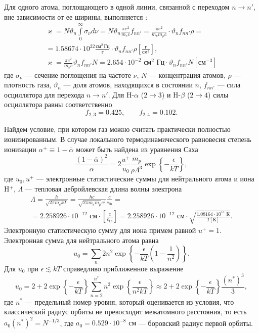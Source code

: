 Для одного атома, поглощающего в одной линии, связанной с переходом $n \to n'$, вне зависимости от ее ширины, выполняется \cite{zeldovich2008}:
\[\begin{gathered}
\varkappa = N\vartheta_n\int\limits_0^\infty \sigma_\nu d\nu = N \vartheta_n\frac{\pi e^2}{m_ec} f_{nn'}= 
 \frac{\pi e^2}{m_e m_p c} \cdot  \vartheta_n f_{nn'}\rho =  \\ =
1.58674 \cdot 10^{22}\frac{\text{см}^2\, \text{Гц}}{\text{г}} \cdot \vartheta_n f_{nn'}\rho \left[\frac{\text{г}}{\text{см}^3}\right]
,\\
\varkappa = \frac{\pi e^2}{m_ec} \vartheta_n f_{nn'} N = 2.654 \cdot 10^{-2} \text{ см}^2 \text{ Гц}
\cdot \vartheta_n f_{nn'} N[\text{см}^{-3}]
\end{gathered}\]
где $\sigma_\nu$ --- сечение поглощения на частоте $\nu$, $N$ --- концентрация атомов, $\rho$ --- плотность газа, $\vartheta_n$ --- доля атомов, находящихся в состоянии $n$, $f_{nn'}$ --- сила осциллятора для перехода $n \to n'$. Для H-$\alpha$ ($2 \to 3$) и H-$\beta$ ($2 \to 4$) силы осциллятора равны соответственно
\[
f_{2,3} = 0.425, \qquad f_{2,4} = 0.102.
\]

Найдем условие, при котором газ можно считать практически полностью ионизированным. В случае локального термодинамического равновесия степень ионизации $\alpha^+ \equiv 1 - \overline{\alpha}$ может быть найдена из уравнения Саха \cite{saha1921}
\[
\frac{(1-\overline{\alpha})^2}{\overline{\alpha}} = 2\frac{u^+}{u_0} \frac{m_p}{\rho\Lambda^3} 
\exp\left\{-\frac{\epsilon}{kT}\right\},
\]
где $u_0, u^+$ --- электронные статистические суммы для нейтрального атома и иона H${}^+$, $\Lambda$ --- тепловая дебройлевская длина волны электрона
\begin{multline*}
\Lambda = \frac{h}{\sqrt{2\pi m_e kT}} = \frac{hc}{\sqrt{2\pi m_e m_p}c^2} \frac{c}{c_\text{th}} = \\
= 2.258926 \cdot 10^{-12} \text{ см} \cdot \left[\frac{c}{c_\text{th}}\right]
= 2.258926 \cdot 10^{-12} \text{ см} \cdot \sqrt{\frac{1.08164 \cdot 10^{13} \text{ К}}{T [\text{К}]}}
 .
\end{multline*}
Электронную статистическую сумму для иона примем равной $u^+ = 1$. Электронная сумма для нейтрального атома равна
\[
u_0 = \sum_n 2n^2 \exp\left\{-\frac{\epsilon}{kT}\left(1 - \frac{1}{n^2}\right)\right\}.
\]
Для $u_0$ при $\epsilon \lesssim kT$ справедливо приближенное выражение 
\[
u_0 = 2 + 2\exp\left\{-\frac{\epsilon}{kT}\right\}\sum_{n = 2}^{n^*} n^2\exp\left\{\frac{\epsilon}{n^2kT}\right\} \approx
2 + 2 \exp\left\{-\frac{\epsilon}{kT}\right\} \frac{(n^*)^3}{3},
\]
где $n^*$ --- предельный номер уровня, который оценивается из условия, что классический радиус орбиты не превосходит межатомного расстояния, то есть $a_0 (n^*)^2 = N^{-1/3}$, где $a_0 = 0.529 \cdot 10^{-8} \text{ см}$ --- боровский радиус первой орбиты.

